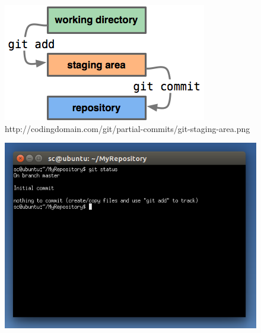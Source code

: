 \documentclass{beamer}
\begin{document}
\begin{frame}
\begin{figure}
\begin{center}
\includegraphics[scale=1.4]{stagingareadiagram}
\caption{http://codingdomain.com/git/partial-commits/git-staging-area.png}
\end{center}
\end{figure}
\end{frame}

\begin{frame}
\begin{figure}
\begin{center}
\includegraphics[scale=0.5]{gitstatus0}
\end{center}
\end{figure}
\end{frame}
\end{document}
